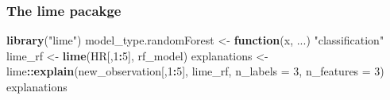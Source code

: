 \documentclass[]{krantz}
\newenvironment{Shaded}{\begin{snugshade}}{\end{snugshade}}
\newcommand{\ControlFlowTok}[1]{\textcolor[rgb]{0.13,0.29,0.53}{\textbf{#1}}}
\newcommand{\DataTypeTok}[1]{\textcolor[rgb]{0.13,0.29,0.53}{#1}}
\newcommand{\DecValTok}[1]{\textcolor[rgb]{0.00,0.00,0.81}{#1}}
\newcommand{\KeywordTok}[1]{\textcolor[rgb]{0.13,0.29,0.53}{\textbf{#1}}}
\newcommand{\NormalTok}[1]{#1}
\newcommand{\OperatorTok}[1]{\textcolor[rgb]{0.81,0.36,0.00}{\textbf{#1}}}
\newcommand{\StringTok}[1]{\textcolor[rgb]{0.31,0.60,0.02}{#1}}
\theoremstyle{definition}
\theoremstyle{definition}
\theoremstyle{definition}
\theoremstyle{remark}
\begin{document}
\hypertarget{the-lime-pacakge}{%
\subsubsection{\texorpdfstring{\textbf{The lime
pacakge}}{The lime pacakge}}\label{the-lime-pacakge}}

\begin{Shaded}
\begin{Highlighting}[]
\KeywordTok{library}\NormalTok{(}\StringTok{"lime"}\NormalTok{)}
\NormalTok{model_type.randomForest <-}\StringTok{ }\ControlFlowTok{function}\NormalTok{(x, ...) }\StringTok{"classification"}
\NormalTok{lime_rf <-}\StringTok{ }\KeywordTok{lime}\NormalTok{(HR[,}\DecValTok{1}\OperatorTok{:}\DecValTok{5}\NormalTok{], rf_model)}
\NormalTok{explanations <-}\StringTok{ }\NormalTok{lime}\OperatorTok{::}\KeywordTok{explain}\NormalTok{(new_observation[,}\DecValTok{1}\OperatorTok{:}\DecValTok{5}\NormalTok{], lime_rf, }\DataTypeTok{n_labels =} \DecValTok{3}\NormalTok{, }\DataTypeTok{n_features =} \DecValTok{3}\NormalTok{)}
\NormalTok{explanations}
\end{Highlighting}
\end{Shaded}
\end{document}
